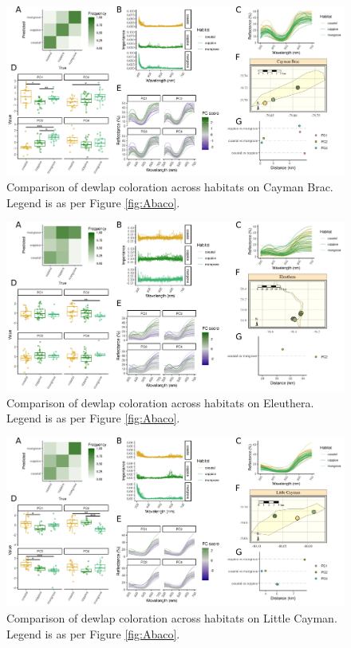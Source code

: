 \begin{figure}[H]
	\centering
	\includegraphics[width=\textwidth]{figures/CaymanBrac.png}
	\caption{Comparison of dewlap coloration across habitats on Cayman Brac. Legend is as per Figure \ref{fig:Abaco}.}
	\label{fig:CaymanBrac}
\end{figure}

\begin{figure}[H]
	\centering
	\includegraphics[width=\textwidth]{figures/Eleuthera.png}
	\caption{Comparison of dewlap coloration across habitats on Eleuthera. Legend is as per Figure \ref{fig:Abaco}.}
	\label{fig:Eleuthera}
\end{figure}

\begin{figure}[H]
	\centering
	\includegraphics[width=\textwidth]{figures/LittleCayman.png}
	\caption{Comparison of dewlap coloration across habitats on Little Cayman. Legend is as per Figure \ref{fig:Abaco}.}
	\label{fig:LittleCayman}
\end{figure}

